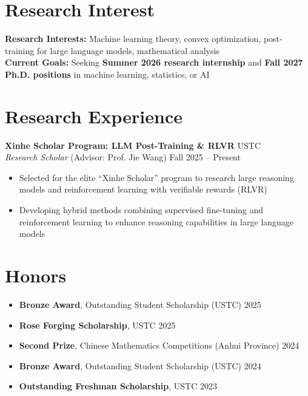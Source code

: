 \documentclass[11pt,a4paper]{article}
\begin{document}
\section{Research Interest}

\noindent \textbf{Research Interests:} Machine learning theory, convex optimization, post-training for large language models, mathematical analysis\\[3pt]
\textbf{Current Goals:} Seeking \textbf{Summer 2026 research internship} and \textbf{Fall 2027 Ph.D. positions} in machine learning, statistics, or AI

\section{Research Experience}

\vspace{6pt}

\noindent \textbf{Xinhe Scholar Program: LLM Post-Training \& RLVR} \hfill USTC \\
\textit{Research Scholar} (Advisor: Prof. Jie Wang) \hfill Fall 2025 -- Present
\begin{itemize}[noitemsep, topsep=2pt, leftmargin=1.5em]
    \item Selected for the elite ``Xinhe Scholar'' program to research large reasoning models and reinforcement learning with verifiable rewards (RLVR)
    \item Developing hybrid methods combining supervised fine-tuning and reinforcement learning to enhance reasoning capabilities in large language models
\end{itemize}

\vspace{6pt}

\section{Honors}

\begin{itemize}[noitemsep, topsep=2pt, leftmargin=1.5em]
    \item \textbf{Bronze Award}, Outstanding Student Scholarship (USTC) \hfill 2025
    \item \textbf{Rose Forging Scholarship}, USTC \hfill 2025
    \item \textbf{Second Prize}, Chinese Mathematics Competitions (Anhui Province) \hfill 2024
    \item \textbf{Bronze Award}, Outstanding Student Scholarship (USTC) \hfill 2024
    \item \textbf{Outstanding Freshman Scholarship}, USTC \hfill 2023
\end{itemize}
\end{document}
